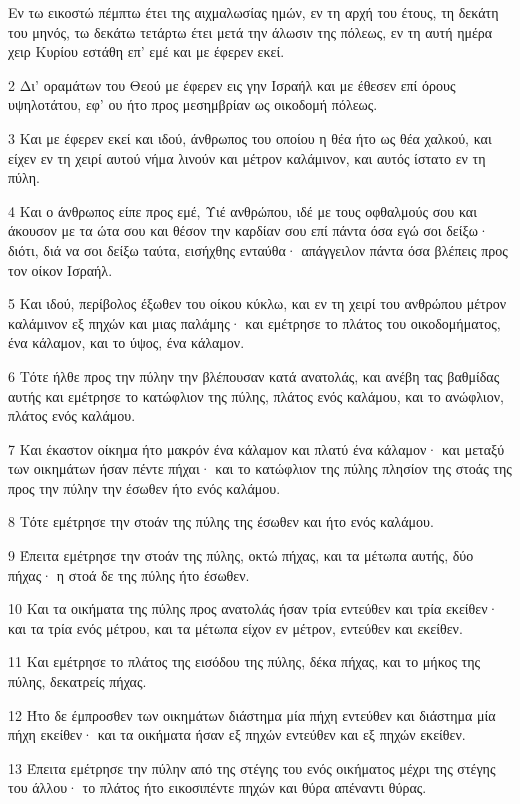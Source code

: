 \par Εν τω εικοστώ πέμπτω έτει της αιχμαλωσίας ημών, εν τη αρχή του έτους, τη δεκάτη του μηνός, τω δεκάτω τετάρτω έτει μετά την άλωσιν της πόλεως, εν τη αυτή ημέρα χειρ Κυρίου εστάθη επ' εμέ και με έφερεν εκεί.
\par 2 Δι' οραμάτων του Θεού με έφερεν εις γην Ισραήλ και με έθεσεν επί όρους υψηλοτάτου, εφ' ου ήτο προς μεσημβρίαν ως οικοδομή πόλεως.
\par 3 Και με έφερεν εκεί και ιδού, άνθρωπος του οποίου η θέα ήτο ως θέα χαλκού, και είχεν εν τη χειρί αυτού νήμα λινούν και μέτρον καλάμινον, και αυτός ίστατο εν τη πύλη.
\par 4 Και ο άνθρωπος είπε προς εμέ, Υιέ ανθρώπου, ιδέ με τους οφθαλμούς σου και άκουσον με τα ώτα σου και θέσον την καρδίαν σου επί πάντα όσα εγώ σοι δείξω· διότι, διά να σοι δείξω ταύτα, εισήχθης ενταύθα· απάγγειλον πάντα όσα βλέπεις προς τον οίκον Ισραήλ.
\par 5 Και ιδού, περίβολος έξωθεν του οίκου κύκλω, και εν τη χειρί του ανθρώπου μέτρον καλάμινον εξ πηχών και μιας παλάμης· και εμέτρησε το πλάτος του οικοδομήματος, ένα κάλαμον, και το ύψος, ένα κάλαμον.
\par 6 Τότε ήλθε προς την πύλην την βλέπουσαν κατά ανατολάς, και ανέβη τας βαθμίδας αυτής και εμέτρησε το κατώφλιον της πύλης, πλάτος ενός καλάμου, και το ανώφλιον, πλάτος ενός καλάμου.
\par 7 Και έκαστον οίκημα ήτο μακρόν ένα κάλαμον και πλατύ ένα κάλαμον· και μεταξύ των οικημάτων ήσαν πέντε πήχαι· και το κατώφλιον της πύλης πλησίον της στοάς της προς την πύλην την έσωθεν ήτο ενός καλάμου.
\par 8 Τότε εμέτρησε την στοάν της πύλης της έσωθεν και ήτο ενός καλάμου.
\par 9 Έπειτα εμέτρησε την στοάν της πύλης, οκτώ πήχας, και τα μέτωπα αυτής, δύο πήχας· η στοά δε της πύλης ήτο έσωθεν.
\par 10 Και τα οικήματα της πύλης προς ανατολάς ήσαν τρία εντεύθεν και τρία εκείθεν· και τα τρία ενός μέτρου, και τα μέτωπα είχον εν μέτρον, εντεύθεν και εκείθεν.
\par 11 Και εμέτρησε το πλάτος της εισόδου της πύλης, δέκα πήχας, και το μήκος της πύλης, δεκατρείς πήχας.
\par 12 Ήτο δε έμπροσθεν των οικημάτων διάστημα μία πήχη εντεύθεν και διάστημα μία πήχη εκείθεν· και τα οικήματα ήσαν εξ πηχών εντεύθεν και εξ πηχών εκείθεν.
\par 13 Έπειτα εμέτρησε την πύλην από της στέγης του ενός οικήματος μέχρι της στέγης του άλλου· το πλάτος ήτο εικοσιπέντε πηχών και θύρα απέναντι θύρας.
